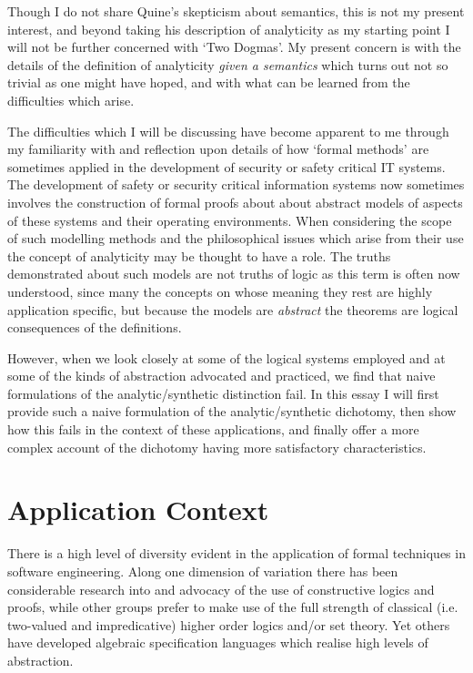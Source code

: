 \documentclass{rbjk}
\begin{document}
\begin{article}
Though I do not share Quine's skepticism about semantics, this is not my present interest, and beyond taking his description of analyticity as my starting point I will not be further concerned with `Two Dogmas'.
My present concern is with the details of the definition of analyticity {\it given a semantics} which turns out not so trivial as one might have hoped, and with what can be learned from the difficulties which arise.

The difficulties which I will be discussing have become apparent to me through my familiarity with and reflection upon details of how `formal methods' are sometimes applied in the development of security or safety critical IT systems.
The development of safety or security critical information systems now sometimes involves the construction of formal proofs about about abstract models of aspects of these systems and their operating environments.
When considering the scope of such modelling methods and the philosophical issues which arise from their use the concept of analyticity may be thought to have a role.
The truths demonstrated about such models are not truths of logic as this term is often now understood, since many the concepts on whose meaning they rest are highly application specific, but because the models are {\it abstract} the theorems are logical consequences of the definitions.

However, when we look closely at some of the logical systems employed and at some of the kinds of abstraction advocated and practiced, we find that naive formulations of the analytic/synthetic distinction fail.
In this essay I will first provide such a naive formulation of the analytic/synthetic dichotomy, then show how this fails in the context of these applications, and finally offer a more complex account of the dichotomy having more satisfactory characteristics.

\section{Application Context}

There is a high level of diversity evident in the application of formal techniques in software engineering.
Along one dimension of variation there has been considerable research into and advocacy of the use of constructive logics and proofs, while other groups prefer to make use of the full strength of classical (i.e. two-valued and impredicative) higher order logics and/or set theory.
Yet others have developed algebraic specification languages which realise high levels of abstraction.


\end{article}
\end{document}
